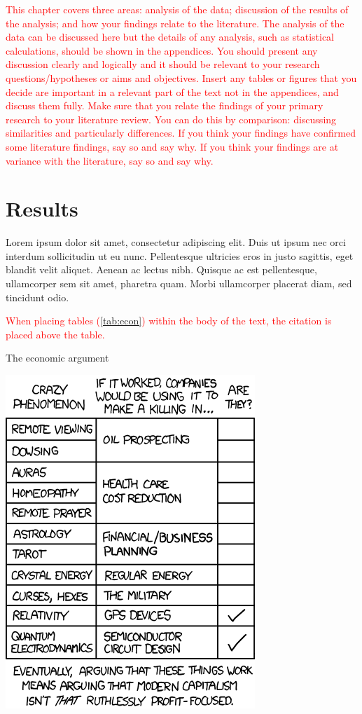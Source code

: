 \textcolor{red}{This chapter covers three areas: analysis of the data; discussion of the results of the analysis; and how your findings relate to the literature. The analysis of the data can be discussed here but the details of any analysis, such as statistical calculations, should be shown in the appendices. You should present any discussion clearly and logically and it should be relevant to your research questions/hypotheses or aims and objectives. Insert any tables or figures that you decide are important in a relevant part of the text not in the appendices, and discuss them fully. Make sure that you relate the findings of your primary research to your literature review. You can do this by comparison: discussing similarities and particularly differences. If you think your findings have confirmed some literature findings, say so and say why. If you think your findings are at variance with the literature, say so and say why.}
\section{Results}
Lorem ipsum dolor sit amet, consectetur adipiscing elit. Duis ut ipsum nec orci interdum sollicitudin ut eu nunc. Pellentesque ultricies eros in justo sagittis, eget blandit velit aliquet. Aenean ac lectus nibh. Quisque ac est pellentesque, ullamcorper sem sit amet, pharetra quam. Morbi ullamcorper placerat diam, sed tincidunt odio.

\textcolor{red}{When placing tables (\autoref{tab:econ}) within the body of the text, the citation is placed above the table.} 

\begin{table}[!ht]
  \centering
  {\small {\it \caption{The economic argument \label{tab:econ} }}}
  \includegraphics [scale=0.5]{Images/the_economic_argument.png} \\
\end{table}

